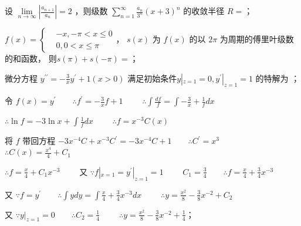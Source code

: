 \documentclass{exam-zh}
\begin{document}
\begin{question}[points = 3]
    设 $\lim\limits_{n \to \infty} |\frac{a_{n + 1}}{a_n}| = 2$ ，则级数 $\sum\limits_{n = 1}^{\infty} \frac{a_n}{3^n}\left(x + 3\right)^n$
    的收敛半径 $R = $\fillin[\frac{1}{6}]； %
\end{question}
\begin{solution}
\end{solution}

\begin{question}[points = 3]
    $f(x) = \left\{
        \begin{aligned}
             & -x, -\pi < x \leq 0 \\
             & 0, 0 < x \leq \pi
        \end{aligned}
        \right
        .$，
    $s(x)$ 为 $f(x)$ 的以 $2\pi$ 为周期的傅里叶级数的和函数，
    则$s\left(\pi\right) + s\left(-\pi\right) = $\fillin[$\frac{\pi}{4}$]； %
\end{question}
\begin{solution}
\end{solution}

\begin{question}[points = 3]
    微分方程 $y^{\prime\prime} = -\frac{3}{x}y^{\prime} + 1 (x > 0)$ 满足初始条件$y|_{z = 1} = 0, y^{\prime}|_{z = 1} = 1$
    的特解为 \fillin[$y = \frac{x^2}{8} - \frac{3}{8}x^{-2} + \frac{1}{4}$]；
\end{question}
\begin{solution}
    令 $f(x) = y^{\prime} \qquad \therefore f^{\prime} = -\frac{3}{x}f + 1 \qquad$
    $\therefore \int\frac{df}{f} = \int -\frac{3}{x} + \frac{1}{f} dx$

    $\therefore \ln f = -3\ln x + \int\frac{1}{f}dx \qquad$
    $\therefore f = x^{-3}C(x)$

    将 $f$ 带回方程 $-3x^{-4}C + x^{-3}C^{\prime} = -3x^{-4}C + 1 \qquad \therefore C^{\prime} = x^3 \qquad$
    $\therefore C(x) = \frac{x^4}{4} + C_1$

    $\therefore f = \frac{x}{4} + C_1x^{-3} \qquad$
    又 $\because f|_{x = 1} = y^{\prime}|_{z = 1} = 1 \qquad$
    $C_1 = \frac{3}{4} \qquad \therefore f = \frac{x}{4} + \frac{3}{4}x^{-3}$

    又 $\because f = y^{\prime} \qquad \therefore \int y dy = \int \frac{x}{4} + \frac{3}{4}x^{-3} dx \qquad$
    $\therefore y = \frac{x^2}{8} - \frac{3}{8}x^{-2} + C_2$

    又 $\because y|_{z = 1} = 0 \qquad \therefore C_2 = \frac{1}{4} \qquad$
    $\therefore y = \frac{x^2}{8} - \frac{3}{8}x^{-2} + \frac{1}{4}$；
\end{solution}
\end{document}
